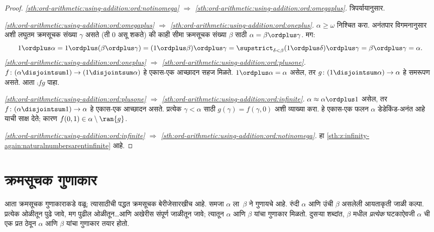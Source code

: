 \begin{proof}
\emph{\ref{sth:ord-arithmetic:using-addition:ord:notinomega} $\Rightarrow$ \ref{sth:ord-arithmetic:using-addition:ord:omegaplus}.} त्रिपर्यायानुसार.

\emph{\ref{sth:ord-arithmetic:using-addition:ord:omegaplus} $\Rightarrow$ \ref{sth:ord-arithmetic:using-addition:ord:oneplus}.} $\alpha \geq \omega$ निश्चित करा. अनंतपार विगमनानुसार अशी लघुतम क्रमसूचक संख्या $\gamma$ असते (ती $0$ असू शकते) की काही सीमा क्रमसूचक संख्या $\beta$ साठी $\alpha = \beta \ordplus \gamma$. मग:
\[
  1 \ordplus \alpha =
  1 \ordplus (\beta \ordplus \gamma) =
  (1 \ordplus \beta) \ordplus \gamma =
  \supstrict_{\delta < \beta} (1 \ordplus  \delta) \ordplus  \gamma =
  \beta \ordplus  \gamma =
  \alpha.
\]
\emph{\ref{sth:ord-arithmetic:using-addition:ord:oneplus} $\Rightarrow$ \ref{sth:ord-arithmetic:using-addition:ord:plusone}.} $f \colon (\alpha \disjointsum 1) \to (1
\disjointsum \alpha)$ हे एकास-एक आच्छादन सहज मिळते. $1 \ordplus \alpha = \alpha$ असेल, तर $g \colon (1 \disjointsum \alpha) \to \alpha$ हे समरूपण असते. आता $\comp{f}{g}$ पाहा.

\emph{\ref{sth:ord-arithmetic:using-addition:ord:plusone} $\Rightarrow$ \ref{sth:ord-arithmetic:using-addition:ord:infinite}.} $\alpha \approx \alpha \ordplus 1$ असेल, तर $f \colon
(\alpha \disjointsum 1) \to \alpha$ हे एकास-एक आच्छादन असते. प्रत्येक $\gamma < \alpha$ साठी $g(\gamma) = f(\gamma, 0)$ अशी व्याख्या करा. हे एकास-एक फलन $\alpha$ डेडेकिंड-अनंत आहे याची साक्ष देते; कारण $f(0,1) \in \alpha \setminus \ran{g}$.

\emph{\ref{sth:ord-arithmetic:using-addition:ord:infinite} $\Rightarrow$ \ref{sth:ord-arithmetic:using-addition:ord:notinomega}.} हा \ref{sth:z:infinity-again:naturalnumbersarentinfinite} आहे.
\end{proof}








\section{क्रमसूचक गुणाकार}\label{sth:ord-arithmetic:mult:sec}

आता क्रमसूचक गुणाकाराकडे वळू; त्यासाठीची पद्धत क्रमसूचक बेरीजेसारखीच आहे. समजा $\alpha$ ला~$\beta$ ने गुणायचे आहे. रुंदी $\alpha$ आणि उंची $\beta$ असलेली आयताकृती जाळी कल्पा. प्रत्येक ओळीतून पुढे जावे, मग पुढील ओळीतून\ldots आणि अखेरीस संपूर्ण जाळीतून जावे; त्यातून $\alpha$ आणि $\beta$ यांचा गुणाकार मिळतो. दुसऱ्या शब्दांत, $\beta$ मधील \emph{प्रत्येक} घटकाऐवजी $\alpha$ ची एक प्रत ठेवून $\alpha$ आणि $\beta$ यांचा गुणाकार तयार होतो.

